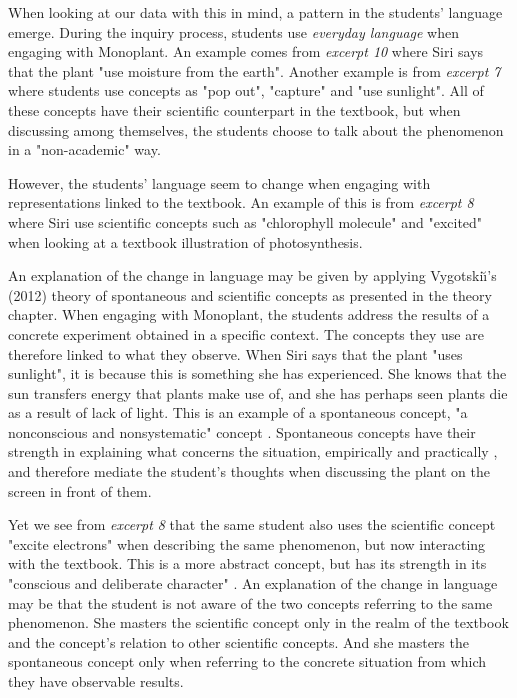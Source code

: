 When looking at our data with this in mind, a pattern in the students' language emerge. During the inquiry process, students use \emph{everyday language} when engaging with Monoplant. An example comes from \emph{excerpt 10} where Siri says that the plant "use moisture from the earth". Another example is from \emph{excerpt 7} where students use concepts as "pop out", "capture" and "use sunlight". All of these concepts have their scientific counterpart in the textbook, but when discussing among themselves, the students choose to talk about the phenomenon in a "non-academic" way. 

However, the students' language seem to change when engaging with representations linked to the textbook. An example of this is from \emph{excerpt 8} where Siri use scientific concepts such as "chlorophyll molecule" and "excited" when looking at a textbook illustration of photosynthesis. 

An explanation of the change in language may be given by applying Vygotski{\u\i}'s (2012) theory of spontaneous and scientific concepts as presented in the theory chapter. When engaging with Monoplant, the students address the results of a concrete experiment obtained in a specific context. The concepts they use are therefore linked to what they observe. When Siri says that the plant "uses sunlight", it is because this is something she has experienced. She knows that the sun transfers energy that plants make use of, and she has perhaps seen plants die as a result of lack of light. This is an example of a spontaneous concept, "a nonconscious and nonsystematic" concept \citep{vygotsky2012thought}. Spontaneous concepts have their strength in explaining what concerns the situation, empirically and practically \citep{vygotsky2012thought}, and  therefore mediate the student's thoughts when discussing the plant on the screen in front of them. 


Yet we see from \emph{excerpt 8} that the same student also uses the scientific concept "excite electrons" when describing the same phenomenon, but now interacting with the textbook. This is a more abstract concept, but has its strength in its "conscious and deliberate character" \citep{vygotsky2012thought}. An explanation of the change in language may be that the student is not aware of the two concepts referring to the same phenomenon. She masters the scientific concept only in the realm of the textbook and the concept's relation to other scientific concepts. And she masters the spontaneous concept only when referring to the concrete situation from which they have observable results. 

